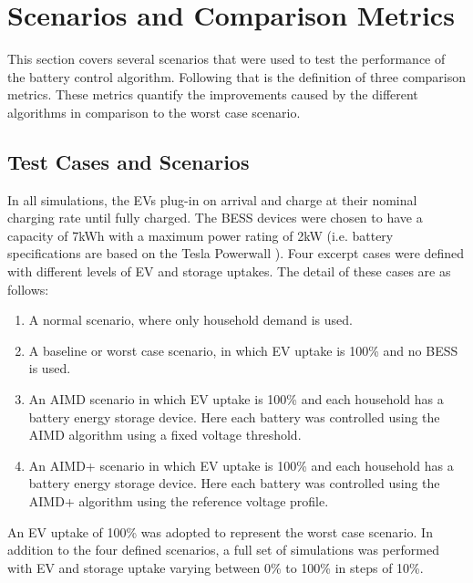 \section{Scenarios and Comparison Metrics}
\label{ch4:sec:scenarios-and-comparison-metrics}

This section covers several scenarios that were used to test the performance of the battery control algorithm.
Following that is the definition of three comparison metrics.
These metrics quantify the improvements caused by the different algorithms in comparison to the worst case scenario.

\subsection{Test Cases and Scenarios}
\label{ch4:subsec:test-cases-and-scenarios}

In all simulations, the EVs plug-in on arrival and charge at their nominal charging rate until fully charged.
The BESS devices were chosen to have a capacity of 7kWh with a maximum power rating of 2kW (i.e. battery specifications are based on the Tesla Powerwall \cite{Powerwall2015}).
Four excerpt cases were defined with different levels of EV and storage uptakes.
The detail of these cases are as follows:

\begin{enumerate}[
labelindent=*,
style=multiline,
leftmargin=*,
label=\textbf{Case \Alph*}
]
\item \label{ch4:case-a}
A normal scenario, where only household demand is used.
\item \label{ch4:case-b}
A baseline or worst case scenario, in which EV uptake is 100\% and no BESS is used.
\item \label{ch4:case-c}
An AIMD scenario in which EV uptake is 100\% and each household has a battery energy storage device.
Here each battery was controlled using the AIMD algorithm using a fixed voltage threshold.
\item \label{ch4:case-d}
An AIMD+ scenario in which EV uptake is 100\% and each household has a battery energy storage device.
Here each battery was controlled using the AIMD+ algorithm using the reference voltage profile.
\end{enumerate}

An EV uptake of 100\% was adopted to represent the worst case scenario.
In addition to the four defined scenarios, a full set of simulations was performed with EV and storage uptake varying between 0\% to 100\% in steps of 10\%.

